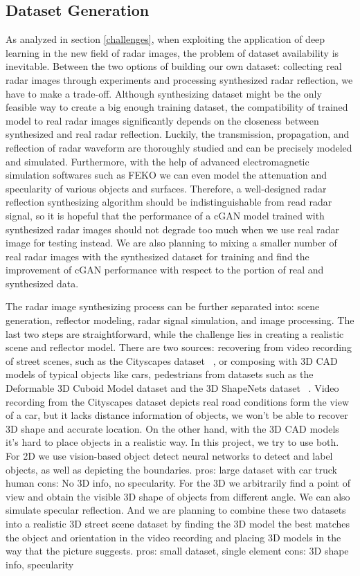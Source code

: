 \subsection{Dataset Generation}
As analyzed in section \ref{challenges}, when exploiting the application of deep learning in the new field of radar images, the problem of dataset availability is inevitable. Between the two options of building our own dataset: collecting real radar images through experiments and processing synthesized radar reflection, we have to make a trade-off. Although synthesizing dataset might be the only feasible way to create a big enough training dataset, the compatibility of trained model to real radar images significantly depends on the closeness between synthesized  and real radar reflection. Luckily, the transmission, propagation, and reflection of radar waveform are thoroughly studied and can be precisely modeled and simulated. Furthermore, with the help of advanced electromagnetic simulation softwares such as FEKO we can even model the attenuation and specularity of various objects and surfaces. Therefore, a well-designed radar reflection synthesizing algorithm should be indistinguishable from read radar signal, so it is hopeful that the performance of a cGAN model trained with synthesized radar images should not degrade too much when we use real radar image for testing instead. We are also planning to mixing a smaller number of real radar images with the synthesized dataset for training and find the improvement of cGAN performance with respect to the portion of real and synthesized data.  

The radar image synthesizing process can be further separated into: scene generation, reflector modeling, radar signal simulation, and image processing. The last two steps are straightforward, while the challenge lies in creating a realistic scene and reflector model. There are two sources: recovering from video recording of street scenes, such as the Cityscapes dataset ~\cite{cityscapes}, or composing with 3D CAD models of typical objects like cars, pedestrians from datasets such as the Deformable 3D Cuboid Model dataset and the 3D ShapeNets dataset ~\cite{3Ddata, shapenets}. Video recording from the Cityscapes dataset depicts real road conditions form the view of a car, but it lacks distance information of objects, we won't be able to recover 3D shape and accurate location. On the other hand, with the 3D CAD models it's hard to place objects in a realistic way. In this project, we try to use both. For 2D we use vision-based object detect neural networks to detect and label objects, as well as depicting the boundaries. pros: large dataset with car truck human cons: No 3D info, no specularity. For the 3D we arbitrarily find a point of view and obtain the visible 3D shape of objects from different angle. We can also simulate specular reflection. And we are planning to combine these two datasets into a realistic 3D street scene dataset by finding the 3D model the best matches the object and orientation in the video recording and placing 3D models in the way that the picture suggests. pros: small dataset, single element 
cons: 3D shape info, specularity  


